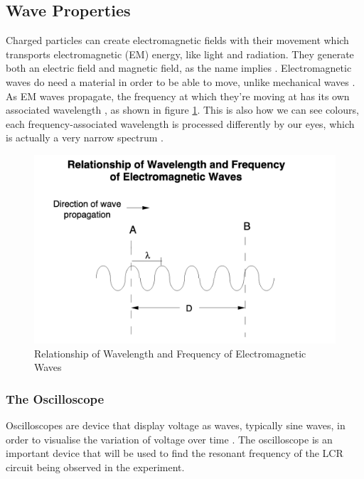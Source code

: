 \documentclass[12pt]{article}
\begin{document}
\subsection{Wave Properties} \label{sec:1.2}

Charged particles can create electromagnetic fields with their movement which transports
electromagnetic (EM) energy, like light and radiation.
They generate both an electric field and magnetic field, as the name implies
\cite{NASAemwave}.
Electromagnetic waves do need a material in order to be able to move, unlike mechanical waves
\cite{NASAemwave}.
As EM waves propagate, the frequency at which they're moving at has its own associated wavelength
\cite{NASAemradio}, as shown in figure \ref{fig:emrelation}. 
This is also how we can see colours, each frequency-associated wavelength is processed differently by our eyes,
which is actually a very narrow spectrum
\cite{emcolour}.

\begin{figure}[H]
    \centering
    \includegraphics[width=15cm]{em wave relation.png}
    \caption{\centering \footnotesize{Relationship of Wavelength and Frequency of Electromagnetic Waves \protect\cite{NASAemradio}}}
    \label{fig:emrelation}
\end{figure}

\subsubsection{The Oscilloscope} \label{sec:1.2.1}

Oscilloscopes are device that display voltage as waves, typically sine waves, in order to visualise the variation of voltage over time
\cite{flukeoscillo,keyoscillo}.
The oscilloscope is an important device that will be used to find the resonant frequency of the LCR circuit being observed in the experiment.
\end{document}
